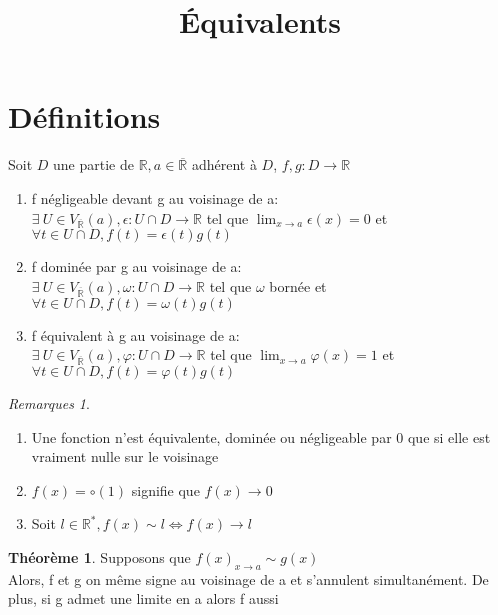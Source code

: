 \documentclass[fleqn]{article}
\title{\'Equivalents}
\date{}
\theoremstyle{definition} \newtheorem*{defi}{D\'efinition}
\theoremstyle{definition} \newtheorem*{theo}{Th\'eor\`eme}
\theoremstyle{remark} \newtheorem*{rqs}{Remarques}
\begin{document}
\maketitle

\section{D\'efinitions}
Soit $D$ une partie de $\mathbb{R}, a \in \overline{\mathbb{R}}$ adh\'erent \`a $D$, $f,g: D \rightarrow \mathbb{R}$
\begin{enumerate}
	\item f n\'egligeable devant g au voisinage de a: \\
		$\exists\ U \in V_{\overline{\mathbb{R}}}(a), \epsilon: U \cap D \rightarrow \mathbb{R}$ tel que $\lim_{x \to a}\epsilon(x) = 0$ et
		$\forall t \in U \cap D, f(t)=\epsilon(t)g(t)$
	\item f domin\'ee par g au voisinage de a: \\
		$\exists\ U \in V_{\overline{\mathbb{R}}}(a), \omega: U \cap D \rightarrow \mathbb{R}$ tel que $\omega$ born\'ee et
		$\forall t \in U \cap D, f(t)=\omega(t)g(t)$
	\item f \'equivalent \`a g au voisinage de a: \\
		$\exists\ U \in V_{\overline{\mathbb{R}}}(a), \varphi: U \cap D \rightarrow \mathbb{R}$ tel que $\lim_{x \to a}\varphi(x) = 1$ et
		$\forall t \in U \cap D, f(t)=\varphi(t)g(t)$
\end{enumerate}

\begin{rqs} $ $
	\begin{enumerate}
		\item Une fonction n'est \'equivalente, domin\'ee ou n\'egligeable par 0 que si elle est vraiment nulle sur le voisinage
		\item $f(x) = \circ(1)$ signifie que $f(x) \rightarrow 0$
		\item Soit $l \in \mathbb{R}^{*}, f(x) \sim l \Leftrightarrow f(x) \rightarrow l$
	\end{enumerate}
\end{rqs}

\begin{theo}
	Supposons que $f(x)_{x \to a} \sim g(x)$\\
	Alors, f et g on m\^eme signe au voisinage de a et s'annulent simultan\'ement. De plus, si g admet une limite en a alors f aussi
\end{theo}
\end{document}
